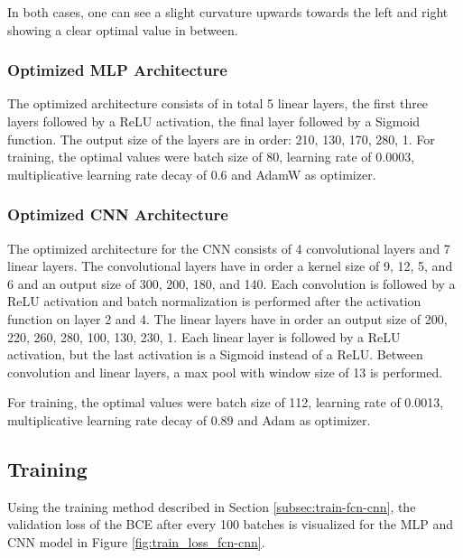 \documentclass[runningheads]{llncs}
\begin{document}
In both cases, one can see a slight curvature upwards towards the left and right showing a clear optimal value in between.



\subsubsection{Optimized MLP Architecture}

The optimized architecture consists of in total 5 linear layers, the first three layers followed by a ReLU activation, the final layer followed by a Sigmoid function. The output size of the layers are in order: 210, 130, 170, 280, 1. For training, the optimal values were batch size of 80, learning rate of 0.0003, multiplicative learning rate decay of 0.6 and AdamW as optimizer.


\subsubsection{Optimized CNN Architecture}

The optimized architecture for the CNN consists of 4 convolutional layers and 7 linear layers. The convolutional layers have in order a kernel size of 9, 12, 5, and 6 and an output size of 300, 200, 180, and 140. Each convolution is followed by a ReLU activation and batch normalization is performed after the activation function on layer 2 and 4.  
The linear layers have in order an output size of 200, 220, 260, 280, 100, 130, 230, 1. Each linear layer is followed by a ReLU activation, but the last activation is a Sigmoid instead of a ReLU. Between convolution and linear layers, a max pool with window size of 13 is performed.

For training, the optimal values were batch size of 112, learning rate of 0.0013, multiplicative learning rate decay of 0.89 and Adam as optimizer.




\subsection{Training}

Using the training method described in Section \ref{subsec:train-fcn-cnn}, the validation loss of the BCE after every 100 batches is visualized for the MLP and CNN model in Figure \ref{fig:train_loss_fcn-cnn}.
\end{document}
